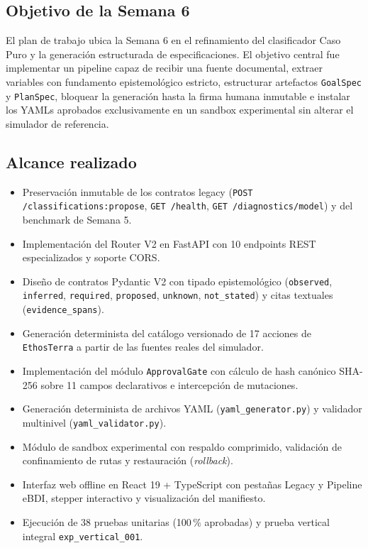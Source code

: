 \documentclass[11pt,a4paper]{article}
\begin{document}
\subsection{Objetivo de la Semana 6}
El plan de trabajo ubica la Semana 6 en el refinamiento del clasificador Caso Puro y la generación estructurada de especificaciones. El objetivo central fue implementar un pipeline capaz de recibir una fuente documental, extraer variables con fundamento epistemológico estricto, estructurar artefactos \texttt{GoalSpec} y \texttt{PlanSpec}, bloquear la generación hasta la firma humana inmutable e instalar los YAMLs aprobados exclusivamente en un sandbox experimental sin alterar el simulador de referencia.

\subsection{Alcance realizado}
\begin{itemize}[leftmargin=*]
    \item Preservación inmutable de los contratos legacy (\texttt{POST /classifications:propose}, \texttt{GET /health}, \texttt{GET /diagnostics/model}) y del benchmark de Semana 5.
    \item Implementación del Router V2 en FastAPI con 10 endpoints REST especializados y soporte CORS.
    \item Diseño de contratos Pydantic V2 con tipado epistemológico (\texttt{observed}, \texttt{inferred}, \texttt{required}, \texttt{proposed}, \texttt{unknown}, \texttt{not\_stated}) y citas textuales (\texttt{evidence\_spans}).
    \item Generación determinista del catálogo versionado de 17 acciones de \texttt{EthosTerra} a partir de las fuentes reales del simulador.
    \item Implementación del módulo \texttt{ApprovalGate} con cálculo de hash canónico SHA-256 sobre 11 campos declarativos e intercepción de mutaciones.
    \item Generación determinista de archivos YAML (\texttt{yaml\_generator.py}) y validador multinivel (\texttt{yaml\_validator.py}).
    \item Módulo de sandbox experimental con respaldo comprimido, validación de confinamiento de rutas y restauración (\textit{rollback}).
    \item Interfaz web offline en React 19 + TypeScript con pestañas Legacy y Pipeline eBDI, stepper interactivo y visualización del manifiesto.
    \item Ejecución de 38 pruebas unitarias (100\,\% aprobadas) y prueba vertical integral \texttt{exp\_vertical\_001}.
\end{itemize}
\end{document}
